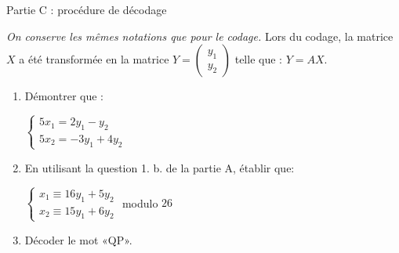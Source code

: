 \begin{h3}Partie C : procédure de décodage\end{h3}
\textit{On conserve les mêmes notations que pour le codage.}
Lors du codage, la matrice $X$ a été transformée en la matrice $Y=\begin{pmatrix} y_{1} \\ y_{2} \end{pmatrix}$  telle que : $Y=A X$.
\begin{enumerate}
     \item
     Démontrer que :
     \par
     $\left\{ \begin{matrix} 5x_{1} = 2y_{1}-y_{2} \\ 5x_{2} =-3y_{1}+4y_{2} \end{matrix}\right.$
          \item
          En utilisant la question 1. b. de la partie A, établir que:
          \par
          $\left\{ \begin{matrix} x_{1} \equiv  16y_{1}+5y_{2} \\ x_{2} \equiv  15y_{1}+6y_{2} \end{matrix}\right.      $ modulo $26$
               \item
          Décoder le mot «QP».\end{enumerate}
